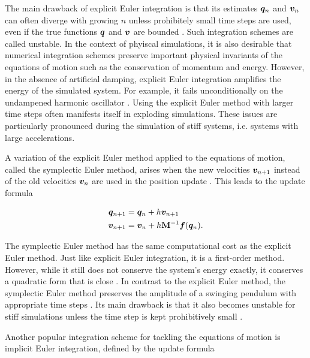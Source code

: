 The main drawback of explicit Euler integration is that its estimates $\bm{q}_n$ and $\bm{v}_n$ can often diverge with growing $n$ unless 
prohibitely small time steps are used, even if the true functions $\bm{q}$ and $\bm{v}$ are bounded \cite{chapra2005}. Such integration schemes 
are called unstable. In the context of phyiscal simulations, it is also desirable that numerical integration schemes preserve important physical 
invariants of the equations of motion such as the conservation of momentum and energy. However, in the absence of artificial damping, explicit
Euler integration amplifies the energy of the simulated system. For example, it fails unconditionally on the undampened harmonic oscillator 
\cite{servin2006}. Using the explicit Euler method with larger time steps often manifests itself in exploding
simulations. These issues are particularly pronounced during the simulation of stiff systems, i.e. systems with large accelerations.

A variation of the explicit Euler method applied to the equations of motion, called the symplectic Euler method, arises when the new 
velocities $\bm{v}_{n+1}$ instead of the old velocities $\bm{v}_n$ are used in the position update \cite{stern2006}. This leads to 
the update formula

\begin{align}
    \begin{split}\label{eq:symplectic-euler}
        \bm{q}_{n+1} &= \bm{q}_n + h\bm{v}_{n+1}\\
        \bm{v}_{n+1} &= \bm{v}_n + h\mathbf{M}^{-1}\bm{f}(\bm{q}_n).
    \end{split}
\end{align}

\noindent The symplectic Euler method has the same computational cost as the explicit Euler method. Just like explicit Euler integration, it 
is a first-order method. However, while it still does not conserve the system's energy exactly, it conserves a quadratic form that is close 
\cite{servin2006}. In contrast to the explicit Euler method, the symplectic Euler method preserves the amplitude of a swinging pendulum with 
appropriate time steps \cite{stern2006}. Its main drawback is that it also becomes unstable for stiff simulations unless the time step is 
kept prohibitively small \cite{servin2006}. 

Another popular integration scheme for tackling the equations of motion is implicit Euler integration, defined by the update formula


